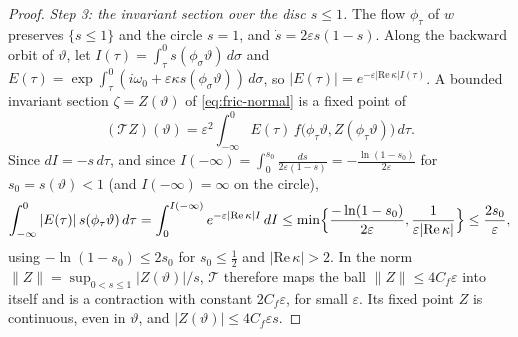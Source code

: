 \documentclass[11pt,reqno]{amsart}
\theoremstyle{plain}
\theoremstyle{definition}
\theoremstyle{remark}
\begin{document}
\begin{proof}
\emph{Step 3: the invariant section over the disc $s\le1$.} The flow $\phi_\tau$ of $w$ preserves $\{s\le1\}$ and the circle
$s=1$, and $\dot s=2\varepsilon s(1-s)$. Along the backward orbit of $\vartheta$, let
$I(\tau)=\int_\tau^0s(\phi_\sigma \vartheta)\,d\sigma$ and $E(\tau)=\exp\int_\tau^0(i\omega_0+\varepsilon\kappa s(\phi_\sigma \vartheta))\,d\sigma$, so
$|E(\tau)|=e^{-\varepsilon|\mathrm{Re}\,\kappa|I(\tau)}$. A bounded invariant section $\zeta=Z(\vartheta)$ of \eqref{eq:fric-normal} is a
fixed point of
\[
  (\mathcal TZ)(\vartheta)=\varepsilon^{2}\int_{-\infty}^{0}E(\tau)\,f\bigl(\phi_\tau \vartheta,Z(\phi_\tau \vartheta)\bigr)\,d\tau .
\]
Since $dI=-s\,d\tau$, and since $I(-\infty)=\int_0^{s_0}\frac{ds}{2\varepsilon(1-s)}=-\frac{\ln(1-s_0)}{2\varepsilon}$ for
$s_0=s(\vartheta)<1$ (and $I(-\infty)=\infty$ on the circle),
\[
  \int_{-\infty}^{0}|E(\tau)|\,s(\phi_\tau \vartheta)\,d\tau=\int_0^{I(-\infty)}e^{-\varepsilon|\mathrm{Re}\,\kappa|I}\,dI
  \le\min\Bigl\{\frac{-\ln(1-s_0)}{2\varepsilon},\frac1{\varepsilon|\mathrm{Re}\,\kappa|}\Bigr\}\le\frac{2s_0}{\varepsilon},
\]
using $-\ln(1-s_0)\le2s_0$ for $s_0\le\frac12$ and $|\mathrm{Re}\,\kappa|>2$. In the norm
$\|Z\|=\sup_{0<s\le1}|Z(\vartheta)|/s$, $\mathcal T$ therefore maps the ball $\|Z\|\le4C_f\varepsilon$ into itself and is a
contraction with constant $2C_f\varepsilon$, for small $\varepsilon$. Its fixed point $Z$ is continuous, even in $\vartheta$, and
$|Z(\vartheta)|\le4C_f\varepsilon s$.


\end{proof}
\end{document}
